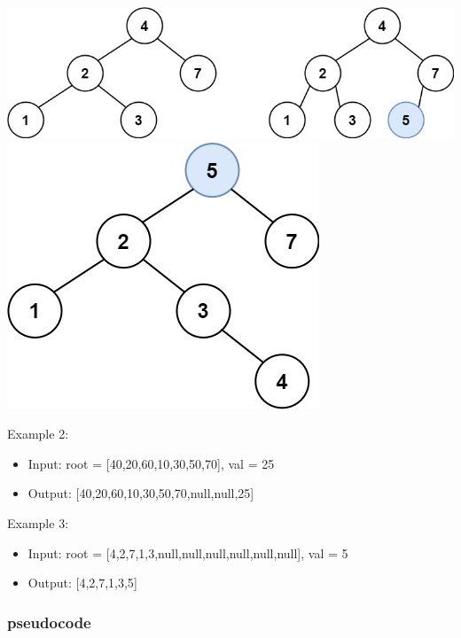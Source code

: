 \documentclass[11pt]{article}
\providecommand{\tightlist}{%
      \setlength{\itemsep}{0pt}\setlength{\parskip}{0pt}}
\begin{document}
\includegraphics{8a906437-9735-41ed-8bc7-eece032e3c59.jpg}
\includegraphics{41e872b4-fac2-4e4b-baa4-96e22c63a8b5.jpg}

Example 2:

\begin{itemize}
\tightlist
\item
  Input: root = {[}40,20,60,10,30,50,70{]}, val = 25
\item
  Output: {[}40,20,60,10,30,50,70,null,null,25{]}
\end{itemize}

Example 3:

\begin{itemize}
\tightlist
\item
  Input: root = {[}4,2,7,1,3,null,null,null,null,null,null{]}, val = 5
\item
  Output: {[}4,2,7,1,3,5{]}
\end{itemize}

    \subsubsection{pseudocode}\label{pseudocode}
\end{document}
